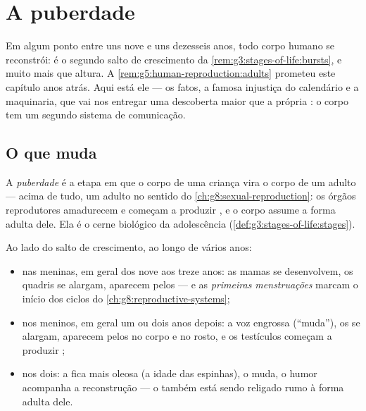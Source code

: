 \chapter{A puberdade}\label{ch:g8:puberty}

Em algum ponto entre uns nove e uns dezesseis anos, todo corpo humano
se reconstrói: é o segundo salto de crescimento da
\cref{rem:g3:stages-of-life:bursts}, e muito mais que altura. A
\cref{rem:g5:human-reproduction:adults} prometeu este capítulo anos
atrás. Aqui está ele --- os fatos, a famosa injustiça do calendário e a
maquinaria, que vai nos entregar uma descoberta maior que a própria
: o corpo tem um segundo sistema de comunicação.

\section{O que muda}

\begin{definition}[Puberdade]\label{def:g8:puberty:puberty}
A \emph{puberdade} é a etapa em que o corpo de uma
criança vira o corpo de um adulto --- acima de tudo, um adulto no
sentido do \cref{ch:g8:sexual-reproduction}: os órgãos reprodutores
amadurecem e começam a produzir \emph{}, e o corpo assume a
forma adulta dele. Ela é o cerne biológico da adolescência
(\cref{def:g3:stages-of-life:stages}).
\end{definition}

\begin{proposition}\label{prop:g8:puberty:changes}
Ao lado do salto de crescimento, ao longo de vários anos:
\begin{itemize}
  \item nas meninas, em geral dos nove aos treze anos: as mamas se
        desenvolvem, os quadris se alargam, aparecem pelos --- e as
        \emph{primeiras menstruações} marcam o início dos ciclos do
        \cref{ch:g8:reproductive-systems};
  \item nos meninos, em geral um ou dois anos depois: a voz
        engrossa (``muda''), os  se alargam, aparecem pelos no
        corpo e no rosto, e os testículos começam a produzir
        ;
  \item nos dois: a  fica mais oleosa (a idade das espinhas), o
         muda, o humor acompanha a reconstrução --- o 
        também está sendo religado rumo à forma adulta dele.
\end{itemize}
\end{proposition}
\admitted

